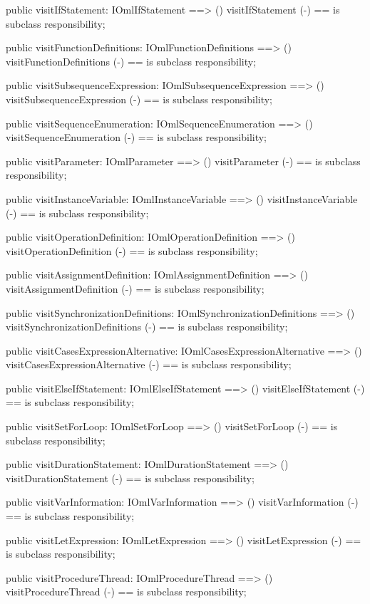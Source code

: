 \begin{vdm_al}
  public visitIfStatement: IOmlIfStatement ==> ()
  visitIfStatement (-) == is subclass responsibility;

  public visitFunctionDefinitions: IOmlFunctionDefinitions ==> ()
  visitFunctionDefinitions (-) == is subclass responsibility;

  public visitSubsequenceExpression: IOmlSubsequenceExpression ==> ()
  visitSubsequenceExpression (-) == is subclass responsibility;

  public visitSequenceEnumeration: IOmlSequenceEnumeration ==> ()
  visitSequenceEnumeration (-) == is subclass responsibility;

  public visitParameter: IOmlParameter ==> ()
  visitParameter (-) == is subclass responsibility;

  public visitInstanceVariable: IOmlInstanceVariable ==> ()
  visitInstanceVariable (-) == is subclass responsibility;

  public visitOperationDefinition: IOmlOperationDefinition ==> ()
  visitOperationDefinition (-) == is subclass responsibility;

  public visitAssignmentDefinition: IOmlAssignmentDefinition ==> ()
  visitAssignmentDefinition (-) == is subclass responsibility;

  public visitSynchronizationDefinitions: IOmlSynchronizationDefinitions ==> ()
  visitSynchronizationDefinitions (-) == is subclass responsibility;

  public visitCasesExpressionAlternative: IOmlCasesExpressionAlternative ==> ()
  visitCasesExpressionAlternative (-) == is subclass responsibility;

  public visitElseIfStatement: IOmlElseIfStatement ==> ()
  visitElseIfStatement (-) == is subclass responsibility;

  public visitSetForLoop: IOmlSetForLoop ==> ()
  visitSetForLoop (-) == is subclass responsibility;

  public visitDurationStatement: IOmlDurationStatement ==> ()
  visitDurationStatement (-) == is subclass responsibility;

  public visitVarInformation: IOmlVarInformation ==> ()
  visitVarInformation (-) == is subclass responsibility;

  public visitLetExpression: IOmlLetExpression ==> ()
  visitLetExpression (-) == is subclass responsibility;

  public visitProcedureThread: IOmlProcedureThread ==> ()
  visitProcedureThread (-) == is subclass responsibility;


\end{vdm_al}
